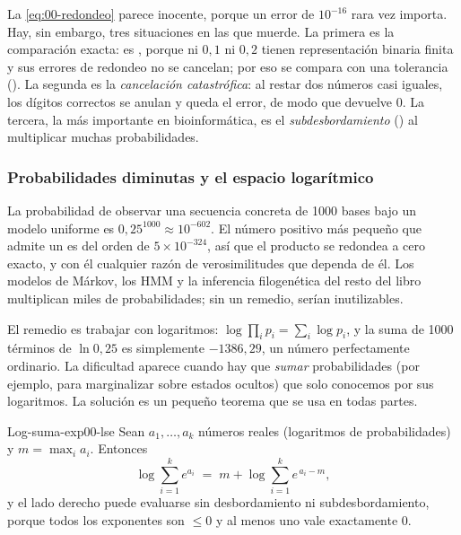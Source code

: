 \begin{simbolos}
\end{simbolos}


La \cref{eq:00-redondeo} parece inocente, porque un error de $10^{-16}$ rara vez importa. Hay, sin embargo, tres situaciones en las que muerde. La primera es la comparación exacta:  es , porque ni $0{,}1$ ni $0{,}2$ tienen representación binaria finita y sus errores de redondeo no se cancelan; por eso se compara con una tolerancia (). La segunda es la \emph{cancelación catastrófica}: al restar dos números casi iguales, los dígitos correctos se anulan y queda el error, de modo que  devuelve $0$. La tercera, la más importante en bioinformática, es el \emph{subdesbordamiento} () al multiplicar muchas probabilidades.

\subsubsection{Probabilidades diminutas y el espacio logarítmico}

La probabilidad de observar una secuencia concreta de 1000 bases bajo un modelo uniforme es $0{,}25^{1000}\approx 10^{-602}$. El número positivo más pequeño que admite un  es del orden de $5\times10^{-324}$, así que el producto se redondea a cero exacto, y con él cualquier razón de verosimilitudes que dependa de él. Los modelos de Márkov, los HMM y la inferencia filogenética del resto del libro multiplican miles de probabilidades; sin un remedio, serían inutilizables.

El remedio es trabajar con logaritmos: $\log\prod_i p_i = \sum_i \log p_i$, y la suma de 1000 términos de $\ln 0{,}25$ es simplemente $-1386{,}29$, un número perfectamente ordinario. La dificultad aparece cuando hay que \emph{sumar} probabilidades (por ejemplo, para marginalizar sobre estados ocultos) que solo conocemos por sus logaritmos. La solución es un pequeño teorema que se usa en todas partes.

\begin{teorema}{Log-suma-exp}{00-lse}
Sean $a_1,\ldots,a_k$ números reales (logaritmos de probabilidades) y $m=\max_i a_i$. Entonces
\begin{equation}\label{eq:00-lse}
\log\sum_{i=1}^{k} e^{a_i} \;=\; m + \log\sum_{i=1}^{k} e^{\,a_i - m},
\end{equation}
y el lado derecho puede evaluarse sin desbordamiento ni subdesbordamiento, porque todos los exponentes son $\le 0$ y al menos uno vale exactamente $0$.
\end{teorema}


